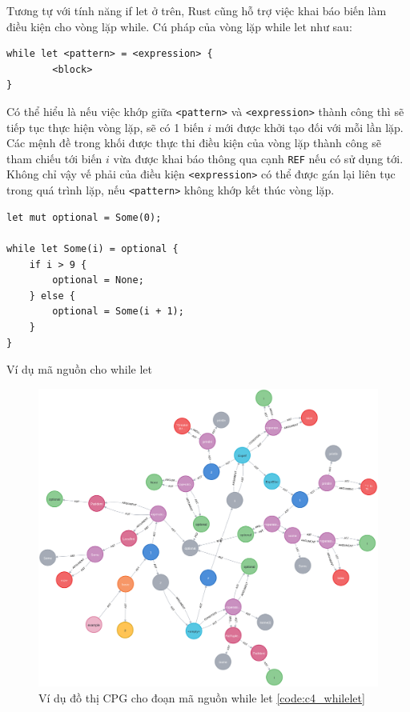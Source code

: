 Tương tự với tính năng if let ở trên, Rust cũng hỗ trợ việc khai báo biến làm điều kiện cho vòng lặp while. Cú pháp của vòng lặp while let như sau:

\begin{verbatim}
while let <pattern> = <expression> {
        <block>
}
\end{verbatim}

Có thể hiểu là nếu việc khớp giữa \texttt{<pattern>} và \texttt{<expression>} thành công thì sẽ tiếp tục thực hiện vòng lặp, sẽ có 1 biến $i$ mới được khởi tạo đối với mỗi lần lặp.
Các mệnh đề trong khối được thực thi điều kiện của vòng lặp thành công sẽ tham chiếu tới biến $i$ vừa được khai báo thông qua cạnh \texttt{REF} nếu có sử dụng tới.
Không chỉ vậy vế phải của điều kiện \texttt{<expression>} có thể được gán lại liên tục trong quá trình lặp, nếu \texttt{<pattern>} không khớp kết thúc vòng lặp.

\begin{listing}[H]
\begin{verbatim}
let mut optional = Some(0);

while let Some(i) = optional {
    if i > 9 {
        optional = None;
    } else {
        optional = Some(i + 1);
    }
}
\end{verbatim}
\caption{Ví dụ mã nguồn cho while let}
\label{code:c4_whilelet}
\end{listing}

\begin{figure}[H]
    \includegraphics[width=1\columnwidth]{figures/c4/c4_whilelet.png}
    \centering
    \caption{Ví dụ đồ thị CPG cho đoạn mã nguồn while let \ref{code:c4_whilelet}}
    \label{img:c4_cpg_whilelet}
\end{figure}

